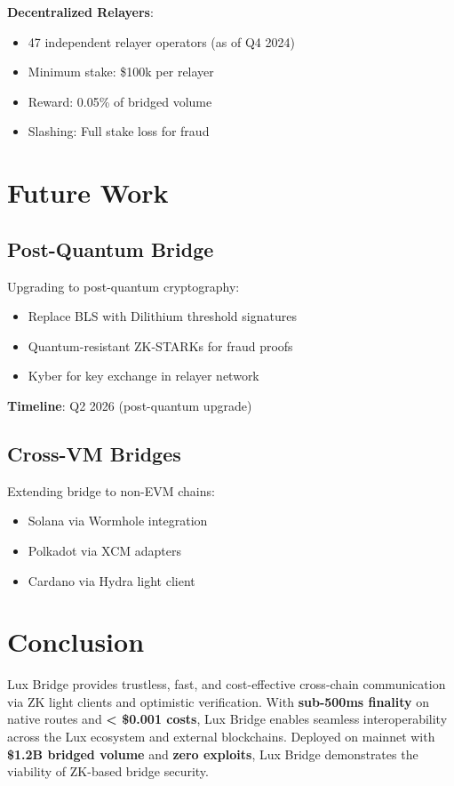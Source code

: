 \documentclass[11pt]{article}
\begin{document}
\textbf{Decentralized Relayers}:
\begin{itemize}[leftmargin=1.1em]
  \item 47 independent relayer operators (as of Q4 2024)
  \item Minimum stake: \$100k per relayer
  \item Reward: 0.05\% of bridged volume
  \item Slashing: Full stake loss for fraud
\end{itemize}

\section{Future Work}

\subsection{Post-Quantum Bridge}

Upgrading to post-quantum cryptography:
\begin{itemize}[leftmargin=1.1em]
  \item Replace BLS with Dilithium threshold signatures
  \item Quantum-resistant ZK-STARKs for fraud proofs
  \item Kyber for key exchange in relayer network
\end{itemize}

\textbf{Timeline}: Q2 2026 (post-quantum upgrade)

\subsection{Cross-VM Bridges}

Extending bridge to non-EVM chains:
\begin{itemize}[leftmargin=1.1em]
  \item Solana via Wormhole integration
  \item Polkadot via XCM adapters
  \item Cardano via Hydra light client
\end{itemize}

\section{Conclusion}

Lux Bridge provides trustless, fast, and cost-effective cross-chain communication via ZK light clients and optimistic verification. With \textbf{sub-500ms finality} on native routes and \textbf{< \$0.001 costs}, Lux Bridge enables seamless interoperability across the Lux ecosystem and external blockchains. Deployed on mainnet with \textbf{\$1.2B bridged volume} and \textbf{zero exploits}, Lux Bridge demonstrates the viability of ZK-based bridge security.
\end{document}

